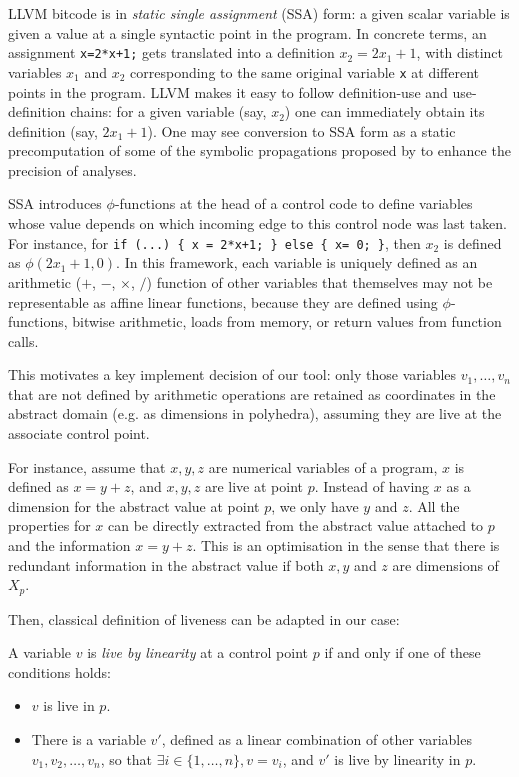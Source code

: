 \documentclass{entcs}
\begin{document}
LLVM bitcode is in \emph{static single assignment} (SSA) form: a given scalar variable is given a value at a single syntactic point in the program. In concrete terms, an assignment \lstinline|x=2*x+1;| gets translated into a definition $x_2 = 2x_1+1$, with distinct variables $x_1$ and $x_2$ corresponding to the same original variable \lstinline|x| at different points in the program.
LLVM makes it easy to follow definition-use and use-definition chains: for a given variable (say, $x_2$) one can immediately obtain its definition (say, $2x_1+1$).
One may see conversion to SSA form as a static precomputation of some of the symbolic propagations proposed by \citet{DBLP:conf/vmcai/Mine06} to enhance the precision of analyses.

SSA introduces $\phi$-functions at the head of a control code to define variables whose value depends on which incoming edge to this control node was last taken. For instance, for \lstinline|if (...) { x = 2*x+1; } else { x= 0; }|, then $x_2$ is defined as $\phi(2x_1+1,0)$. In this framework, each variable is uniquely defined as an arithmetic ($+$, $-$, $\times$, $/$) function of other variables that themselves may not be representable as affine linear functions, because they are defined using $\phi$-functions, bitwise arithmetic, loads from memory, or return values from function calls.

This motivates a key implement decision of our tool: only those variables
$v_1,\dots,v_n$ that are not defined by arithmetic operations are retained as
coordinates in the abstract domain (e.g. as dimensions in polyhedra), assuming
they are live at the associate control point. 

	For instance, assume that $x,y,z$ are numerical variables of a program,
	$x$ is defined as $x = y+z$, and $x,y,z$ are live at point $p$. Instead of having
	$x$ as a dimension for the abstract value at point $p$, we only have $y$ and $z$. All the properties
	for $x$ can be directly extracted from the abstract value attached to $p$ and the information $x=y+z$.
	This is an optimisation in the sense that there is redundant information in
	the abstract value if both $x,y$ and $z$ are dimensions of $X_p$.

	Then, classical definition of liveness can be adapted in our case:

	\begin{definition}
	A variable $v$ is \emph{live by linearity} at a control point $p$ if and
	only if one of these conditions holds:
		\begin{itemize}
		\item $v$ is live in $p$.
		\item There is a variable $v'$, defined as a linear combination of other
		variables $v_1, v_2, \dots, v_n$, so that $\exists i \in \{1,\dots,n\}, v = v_i$,
		and $v'$ is live by linearity in $p$.
		\end{itemize}
	\end{definition}
\end{document}
